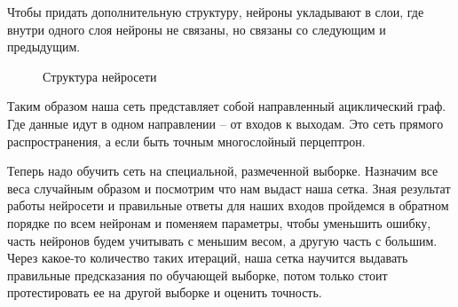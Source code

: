 \documentclass{article}
\begin{document}
Чтобы придать дополнительную структуру, нейроны укладывают в слои, где внутри одного слоя нейроны не связаны, но связаны со следующим и предыдущим.

\begin{figure}[h]
    \caption{Структура нейросети}
\end{figure}

Таким образом наша сеть представляет собой направленный ациклический граф. Где данные идут в одном направлении -- от входов к выходам. Это сеть прямого распространения, а если быть точным многослойный перцептрон.



Теперь надо обучить сеть на специальной, размеченной выборке. Назначим все веса случайным образом и посмотрим что нам выдаст наша сетка. Зная результат работы нейросети и правильные ответы для наших входов пройдемся в обратном порядке по всем нейронам и поменяем параметры, чтобы уменьшить ошибку, часть нейронов будем учитывать с меньшим весом, а другую часть с большим. Через какое-то количество таких итераций, наша сетка научится выдавать правильные предсказания по обучающей выборке, потом только стоит протестировать ее на другой выборке и оценить точность.
\end{document}
